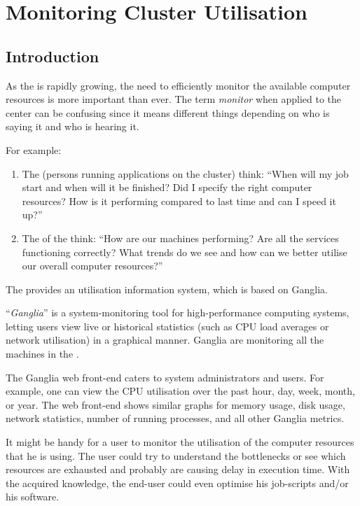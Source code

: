 \chapter{Monitoring Cluster Utilisation}
\label{ch:monitoring-cluster-utilization}

\section{Introduction}

As the \hpc is rapidly growing, the need to efficiently monitor the available
computer resources is more important than ever. The term \emph{monitor} when
applied to the \hpc center can be confusing since it means different things
depending on who is saying it and who is hearing it.

For example:

\begin{enumerate}
\item  The  (persons running applications on the cluster) think: ``When will my job start and when will it be finished? Did I specify the right computer resources?  How is it performing compared to last time and can I speed it up?''
\item  The  of the \hpc think: ``How are our machines
performing? Are all the services functioning correctly? What trends do we see and how can we better utilise our overall computer resources?''
\end{enumerate}

The \hpc provides an \hpc utilisation information system, which is based on Ganglia.

``\emph{Ganglia}'' is a system-monitoring tool for high-performance computing
systems, letting users view live or historical statistics (such as CPU load
averages or network utilisation) in a graphical manner. Ganglia are monitoring
all the machines in the \hpc.

The Ganglia web front-end caters to system administrators and users. For
example, one can view the CPU utilisation over the past hour, day, week, month,
or year. The web front-end shows similar graphs for memory usage, disk usage,
network statistics, number of running processes, and all other Ganglia metrics.

It might be handy for a user to monitor the utilisation of the computer
resources that he is using. The user could try to understand the bottlenecks or
see which resources are exhausted and probably are causing delay in execution
time. With the acquired knowledge, the end-user could even optimise his
job-scripts and/or his software.

